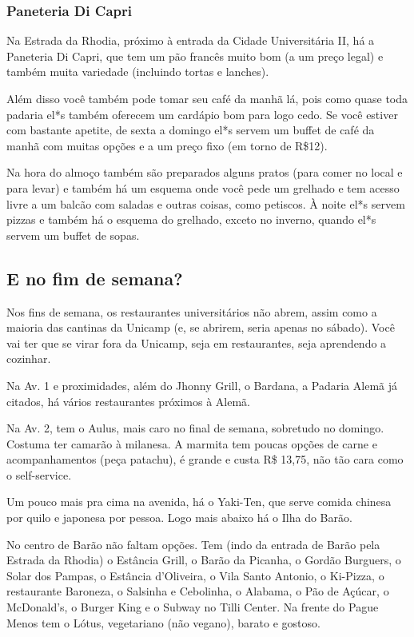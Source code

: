 \subsubsection{Paneteria Di Capri}

Na Estrada da Rhodia, próximo à entrada da Cidade Universitária II, há a
Paneteria Di Capri, que tem um pão francês muito bom (a um preço legal) e
também muita variedade (incluindo tortas e lanches).

Além disso você também pode tomar seu café da manhã lá, pois como quase toda
padaria el*s também oferecem um cardápio bom para logo cedo. Se você estiver
com bastante apetite, de sexta a domingo el*s servem um buffet de café da manhã
com muitas opções e a um preço fixo (em torno de R\$12).

Na hora do almoço também são preparados alguns pratos (para comer no local e
para levar) e também há um esquema onde você pede um grelhado e tem acesso
livre a um balcão com saladas e outras coisas, como petiscos. À noite el*s
servem pizzas e também há o esquema do grelhado, exceto no inverno, quando el*s
servem um buffet de sopas.

\subsection{E no fim de semana?}

Nos fins de semana, os restaurantes universitários não abrem, assim como a
maioria das cantinas da Unicamp (e, se abrirem, seria apenas no sábado). Você
vai ter que se virar fora da Unicamp, seja em restaurantes, seja aprendendo a
cozinhar.

Na Av. 1 e proximidades, além do Jhonny Grill, o Bardana, a Padaria Alemã já
citados, há vários restaurantes próximos à Alemã.

Na Av. 2, tem o Aulus, mais caro no final de semana, sobretudo no domingo.
Costuma ter camarão à milanesa. A marmita tem poucas opções de carne e
acompanhamentos (peça patachu), é grande e custa R\$ 13,75, não tão cara como
o self-service.

Um pouco mais pra cima na avenida, há o Yaki-Ten, que serve comida chinesa por
quilo e japonesa por pessoa. Logo mais abaixo há o Ilha do Barão.

No centro de Barão não faltam opções. Tem (indo da entrada de Barão pela
Estrada da Rhodia) o Estância Grill, o Barão da Picanha, o Gordão Burguers, o
Solar dos Pampas, o Estância d'Oliveira, o Vila Santo Antonio, o Ki-Pizza, o
restaurante Baroneza, o Salsinha e Cebolinha, o Alabama, o Pão de Açúcar, o
McDonald's, o Burger King e o Subway no Tilli Center. Na frente do Pague Menos
tem o Lótus, vegetariano (não vegano), barato e gostoso.

